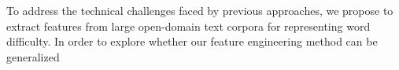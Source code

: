 To address the technical challenges faced by previous approaches, 
we propose to extract features from large open-domain text corpora 
for representing word difficulty.
In order to explore whether our feature engineering method can be generalized 
